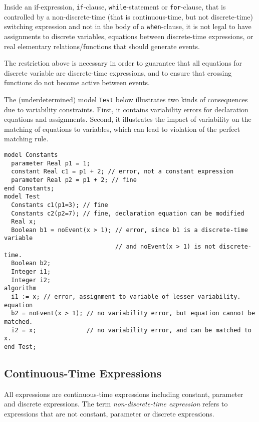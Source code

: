 Inside an if-expression, \lstinline!if!-clause, \lstinline!while!-statement or \lstinline!for!-clause, that
is controlled by a non-discrete-time (that is continuous-time, but not
discrete-time) switching expression and not in the body of a
\lstinline!when!-clause, it is not legal to have assignments to discrete variables,
equations between discrete-time expressions, or real elementary
relations/functions that should generate events.

\begin{nonnormative}
The restriction above is necessary in order to guarantee that all equations for discrete variable are discrete-time expressions, and to ensure that crossing
functions do not become active between events.
\end{nonnormative}

\begin{example}
The (underdetermined) model \lstinline!Test! below illustrates two kinds of consequences due to variability constraints.
First, it contains variability errors for declaration equations and assignments.
Second, it illustrates the impact of variability on the matching of equations to variables, which can
lead to violation of the perfect matching rule.
\begin{lstlisting}[language=modelica]
model Constants
  parameter Real p1 = 1;
  constant Real c1 = p1 + 2; // error, not a constant expression
  parameter Real p2 = p1 + 2; // fine
end Constants;
model Test
  Constants c1(p1=3); // fine
  Constants c2(p2=7); // fine, declaration equation can be modified
  Real x;
  Boolean b1 = noEvent(x > 1); // error, since b1 is a discrete-time variable
                               // and noEvent(x > 1) is not discrete-time.
  Boolean b2;
  Integer i1;
  Integer i2;
algorithm
  i1 := x; // error, assignment to variable of lesser variability.
equation
  b2 = noEvent(x > 1); // no variability error, but equation cannot be matched.
  i2 = x;              // no variability error, and can be matched to x.
end Test;
\end{lstlisting}
\end{example}

\subsection{Continuous-Time Expressions}

All expressions are continuous-time expressions including constant,
parameter and discrete expressions. The term \emph{non-discrete-time
expression} refers to expressions that are not constant, parameter or
discrete expressions.
